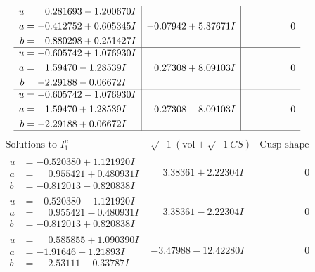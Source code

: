 \documentclass[1p]{elsarticle_modified}
\theoremstyle{definition}
\newcommand{\I}{\sqrt{-1}}
\begin{document}
$$\begin{array}{c|c|c}
\begin{aligned}
u &= \phantom{-}0.281693 - 1.200670 I \\
a &= -0.412752 + 0.605345 I \\
b &= \phantom{-}0.880298 + 0.251427 I\end{aligned}
 & -0.07942 + 5.37671 I & \phantom{-0.000000 } 0 \\ \hline\begin{aligned}
u &= -0.605742 + 1.076930 I \\
a &= \phantom{-}1.59470 - 1.28539 I \\
b &= -2.29188 - 0.06672 I\end{aligned}
 & \phantom{-}0.27308 + 8.09103 I & \phantom{-0.000000 } 0 \\ \hline\begin{aligned}
u &= -0.605742 - 1.076930 I \\
a &= \phantom{-}1.59470 + 1.28539 I \\
b &= -2.29188 + 0.06672 I\end{aligned}
 & \phantom{-}0.27308 - 8.09103 I & \phantom{-0.000000 } 0\\
 \hline 
 \end{array}$$\newpage$$\begin{array}{c|c|c}  
\text{Solutions to }I^u_{1}& \I (\text{vol} + \sqrt{-1}CS) & \text{Cusp shape}\\
 \hline 
\begin{aligned}
u &= -0.520380 + 1.121920 I \\
a &= \phantom{-}0.955421 + 0.480931 I \\
b &= -0.812013 - 0.820838 I\end{aligned}
 & \phantom{-}3.38361 + 2.22304 I & \phantom{-0.000000 } 0 \\ \hline\begin{aligned}
u &= -0.520380 - 1.121920 I \\
a &= \phantom{-}0.955421 - 0.480931 I \\
b &= -0.812013 + 0.820838 I\end{aligned}
 & \phantom{-}3.38361 - 2.22304 I & \phantom{-0.000000 } 0 \\ \hline\begin{aligned}
u &= \phantom{-}0.585855 + 1.090390 I \\
a &= -1.91646 - 1.21893 I \\
b &= \phantom{-}2.53111 - 0.33787 I\end{aligned}
 & -3.47988 - 12.42280 I & \phantom{-0.000000 } 0 \\ \hline\begin{aligned}

\end{aligned}
\end{array}$$
\end{document}
